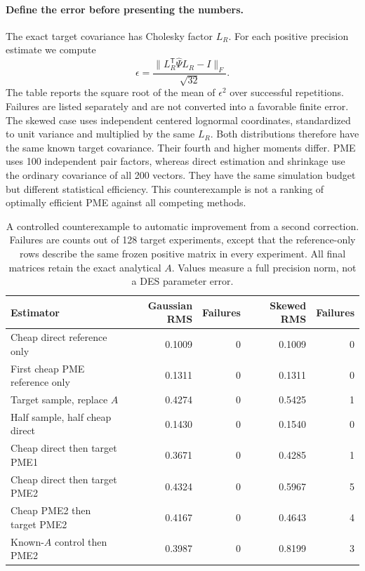 \documentclass[11pt]{article}
\begin{document}
\paragraph{Define the error before presenting the numbers.}
The exact target covariance has Cholesky factor $L_R$. For each positive
precision estimate we compute
\begin{equation}
 \epsilon=\frac{\|L_R^{\mathsf T}\widehat\Psi L_R-I\|_F}{\sqrt{32}}.
\end{equation}
The table reports the square root of the mean of $\epsilon^2$ over
successful repetitions. Failures are listed separately and are not
converted into a favorable finite error. The skewed case uses independent
centered lognormal coordinates, standardized to unit variance and multiplied
by the same $L_R$. Both distributions therefore have the same known target
covariance. Their fourth and higher moments differ. PME uses 100 independent
pair factors, whereas direct estimation and shrinkage use the ordinary
covariance of all 200 vectors. They have the same simulation budget but
different statistical efficiency. This counterexample is not a ranking
of optimally efficient PME against all competing methods.

\begin{table}[htbp]
\centering\small
\begin{tabular}{lrrrr}
\toprule
Estimator & Gaussian RMS & Failures & Skewed RMS & Failures\\
\midrule
Cheap direct reference only & 0.1009 & 0 & 0.1009 & 0\\
First cheap PME reference only & 0.1311 & 0 & 0.1311 & 0\\
Target sample, replace $A$ & 0.4274 & 0 & 0.5425 & 1\\
Half sample, half cheap direct & 0.1430 & 0 & 0.1540 & 0\\
Cheap direct then target PME1 & 0.3671 & 0 & 0.4285 & 1\\
Cheap direct then target PME2 & 0.4324 & 0 & 0.5967 & 5\\
Cheap PME2 then target PME2 & 0.4167 & 0 & 0.4643 & 4\\
Known-$A$ control then PME2 & 0.3987 & 0 & 0.8199 & 3\\
\bottomrule
\end{tabular}
\caption{A controlled counterexample to automatic improvement from a second
correction. Failures are counts out of 128 target experiments, except that
the reference-only rows describe the same frozen positive matrix in every
experiment. All final matrices retain the exact analytical $A$. Values
measure a full precision norm, not a DES parameter error.}
\label{tab:two-stage-toy}
\end{table}
\end{document}
